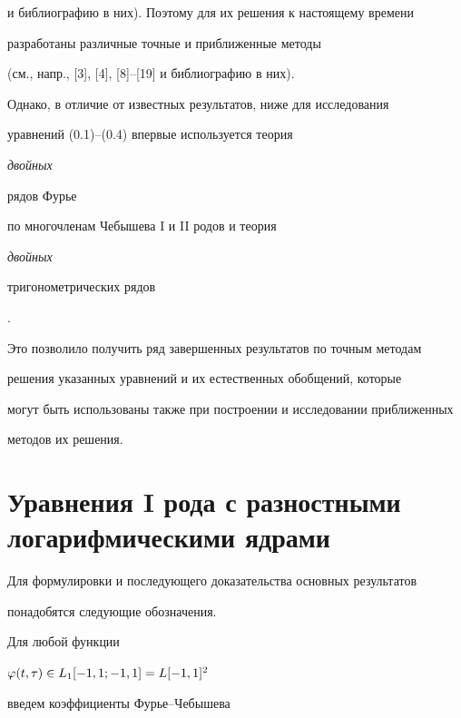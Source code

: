 и библиографию в них). Поэтому для их решения к настоящему времени 


разработаны различные точные и приближенные методы


(см., напр., [3], [4], [8]--[19] и библиографию в них).


Однако, в отличие от известных результатов, ниже для исследования 


уравнений (0.1)--(0.4) впервые используется теория {\it двойных 


рядов Фурье} по многочленам Чебышева I  и II родов и теория {\it двойных 


тригонометрических рядов}.


Это позволило получить ряд завершенных результатов по точным методам 


решения указанных уравнений и их естественных обобщений, которые 


могут быть использованы также при построении и исследовании приближенных 


методов их решения.








\section{Уравнения I рода с разностными логарифмическими ядрами}





Для формулировки и последующего доказательства основных результатов 


понадобятся следующие обозначения.





Для любой функции 


$\varphi(t,\tau) \in L_1[-1,1;-1,1] = L[-1,1]^2$


введем коэффициенты Фурье--Чебышева


